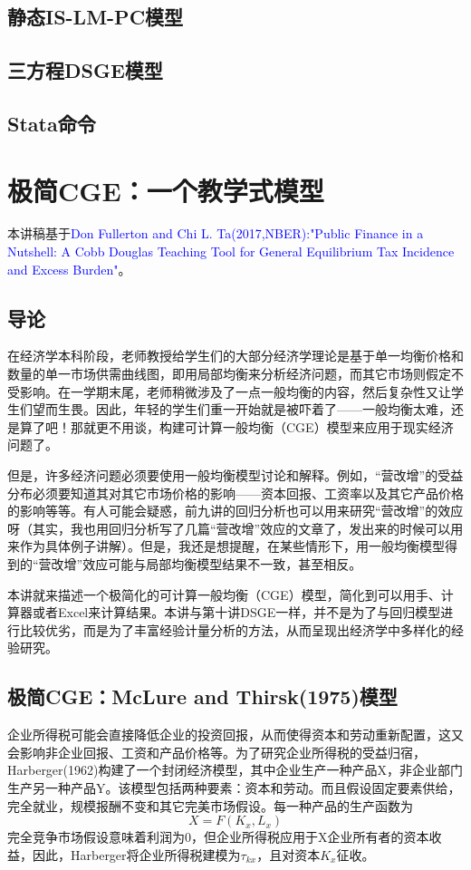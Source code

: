 \documentclass[cn,12pt,math=newtx,citestyle=gb7714-2015,bibstyle=gb7714-2015]{elegantbook}
\begin{document}
	\section{静态IS-LM-PC模型}
	
	
	\section{三方程DSGE模型}
	
	
	\section{Stata命令}
	
	
	
	\chapter{极简CGE：一个教学式模型}
	
	
	
		本讲稿基于\textcolor{blue}{Don Fullerton and Chi L. Ta(2017,NBER):"Public Finance in a Nutshell: A Cobb Douglas Teaching Tool for General Equilibrium Tax Incidence and Excess Burden"}。
	
	
	
	
	\section{导论}
	在经济学本科阶段，老师教授给学生们的大部分经济学理论是基于单一均衡价格和数量的单一市场供需曲线图，即用局部均衡来分析经济问题，而其它市场则假定不受影响。在一学期末尾，老师稍微涉及了一点一般均衡的内容，然后复杂性又让学生们望而生畏。因此，年轻的学生们重一开始就是被吓着了——一般均衡太难，还是算了吧！那就更不用谈，构建可计算一般均衡（CGE）模型来应用于现实经济问题了。
	
	但是，许多经济问题必须要使用一般均衡模型讨论和解释。例如，“营改增”的受益分布必须要知道其对其它市场价格的影响——资本回报、工资率以及其它产品价格的影响等等。有人可能会疑惑，前九讲的回归分析也可以用来研究“营改增”的效应呀（其实，我也用回归分析写了几篇“营改增”效应的文章了，发出来的时候可以用来作为具体例子讲解）。但是，我还是想提醒，在某些情形下，用一般均衡模型得到的“营改增”效应可能与局部均衡模型结果不一致，甚至相反。
	
	本讲就来描述一个极简化的可计算一般均衡（CGE）模型，简化到可以用手、计算器或者Excel来计算结果。本讲与第十讲DSGE一样，并不是为了与回归模型进行比较优劣，而是为了丰富经验计量分析的方法，从而呈现出经济学中多样化的经验研究。
	
	\section{极简CGE：McLure and Thirsk(1975)模型}
	企业所得税可能会直接降低企业的投资回报，从而使得资本和劳动重新配置，这又会影响非企业回报、工资和产品价格等。为了研究企业所得税的受益归宿，Harberger(1962)构建了一个封闭经济模型，其中企业生产一种产品X，非企业部门生产另一种产品Y。该模型包括两种要素：资本和劳动。而且假设固定要素供给，完全就业，规模报酬不变和其它完美市场假设。每一种产品的生产函数为
	$$X=F(K_x,L_x)$$
	完全竞争市场假设意味着利润为0，但企业所得税应用于X企业所有者的资本收益，因此，Harberger将企业所得税建模为$\tau_{kx}$，且对资本$K_x$征收。
	
\end{document}
